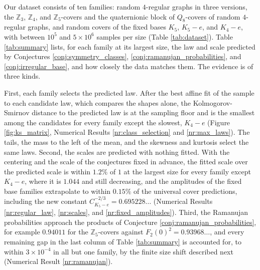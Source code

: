 \documentclass[12pt,oneside,english]{amsart}
\numberwithin{equation}{section}
\numberwithin{figure}{section}
\numberwithin{table}{section}
\theoremstyle{plain}
\numberwithin{thm}{section}
\theoremstyle{plain}
\theoremstyle{plain}
\theoremstyle{plain}
\theoremstyle{definition}
\theoremstyle{definition}
\theoremstyle{definition}
\theoremstyle{remark}
\begin{document}
Our dataset consists of ten families: random $4$-regular graphs in
three versions, the $\mathbb{Z}_{3}$, $\mathbb{Z}_{4}$, and $\mathbb{Z}_{5}$-covers
and the quaternionic block of $Q_{8}$-covers of random $4$-regular
graphs, and random covers of the fixed bases $K_{5}$, $K_{5}-e$,
and $K_{4}-e$, with between $10^{5}$ and $5\times10^{6}$ samples
per size (Table \ref{tab:dataset}). Table \ref{tab:summary} lists,
for each family at its largest size, the law and scale predicted by
Conjectures \ref{conj:symmetry_classes}, \ref{conj:ramanujan_probabilities},
and \ref{conj:irregular_base}, and how closely the data matches them.
The evidence is of three kinds.

First, each family selects the predicted law. After the best affine
fit of the sample to each candidate law, which compares the shapes
alone, the Kolmogorov-Smirnov distance to the predicted law is at
the sampling floor and is the smallest among the candidates for every
family except the slowest, $K_{4}-e$ (Figure \ref{fig:ks_matrix},
Numerical Results \ref{nr:class_selection} and \ref{nr:max_laws}).
The tails, the mass to the left of the mean, and the skewness and kurtosis
select the same laws. Second, the scales are predicted with nothing
fitted. With the centering and the scale of the conjectures fixed
in advance, the fitted scale over the predicted scale is within $1.2\%$
of $1$ at the largest size for every family except $K_{4}-e$, where
it is $1.044$ and still decreasing, and the amplitudes of the fixed
base families extrapolate to within $0.15\%$ of the universal cover
predictions, including the new constant $C_{K_{5}-e}^{-2/3}=0.695228\dots$
(Numerical Results \ref{nr:regular_law}, \ref{nr:scales}, and \ref{nr:fixed_amplitudes}).
Third, the Ramanujan probabilities approach the products of Conjecture
\ref{conj:ramanujan_probabilities}, for example $0.94011$ for the
$\mathbb{Z}_{5}$-covers against $F_{2}(0)^{2}=0.93968\dots$, and
every remaining gap in the last column of Table \ref{tab:summary}
is accounted for, to within $3\times10^{-4}$ in all but one family,
by the finite size shift described next (Numerical Result \ref{nr:ramanujan}).
\end{document}
